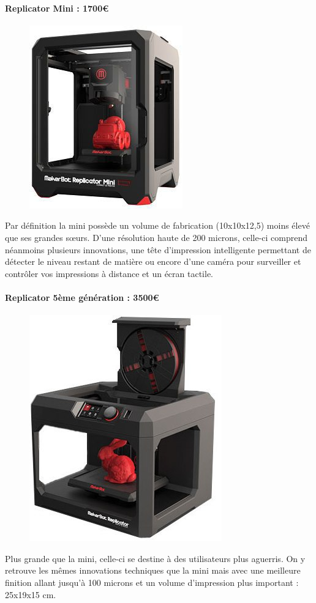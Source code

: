 \documentclass{article}
\begin{document}
\paragraph{Replicator Mini : 1700\euro{}} \hfill
\begin{figure}[h!]
\centering
\includegraphics[scale=0.4]{./images/replicator-mini2.png}
\end{figure}\hfill \break
Par définition la mini possède un volume de fabrication (10x10x12,5) moins élevé que ses grandes sœurs. D'une résolution haute de 200 microns, celle-ci comprend néanmoins plusieurs innovations, une tête d'impression intelligente permettant de détecter le niveau restant de matière ou encore d'une caméra pour surveiller et contrôler vos impressions à distance et un écran tactile.

\paragraph{Replicator 5ème génération : 3500\euro{}} \hfill
\begin{figure}[h!]
\centering
\includegraphics[scale=0.4]{./images/replicator-5G.png}
\end{figure}\hfill \break
Plus grande que la mini, celle-ci se destine à des utilisateurs plus aguerris. On y retrouve les mêmes
innovations techniques que la mini mais avec une meilleure finition allant jusqu'à 100 microns et un volume d'impression plus important : 25x19x15 cm.
\newpage
\end{document}
